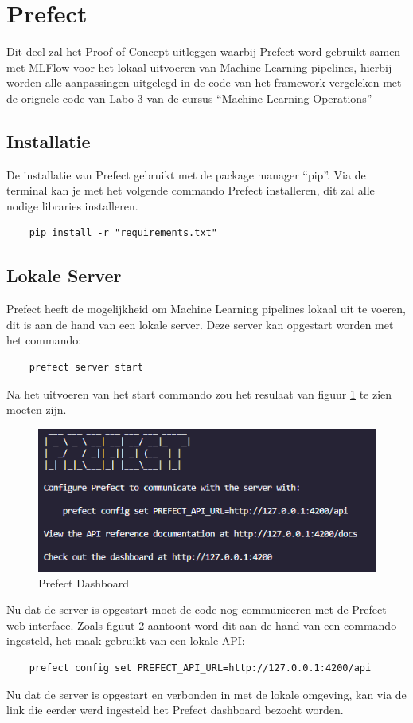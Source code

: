 \section{Prefect}
Dit deel zal het Proof of Concept uitleggen waarbij Prefect word gebruikt samen met MLFlow voor het lokaal uitvoeren van Machine Learning pipelines, hierbij worden alle aanpassingen uitgelegd in de code van het framework vergeleken met de orignele code van Labo 3 van de cursus ``Machine Learning Operations''
\subsection{Installatie}
De installatie van Prefect gebruikt met de package manager ``pip''. Via de terminal kan je met het volgende commando Prefect installeren, dit zal alle nodige libraries installeren.
\begin{verbatim}
    pip install -r "requirements.txt"
\end{verbatim}
\subsection{Lokale Server}
Prefect heeft de mogelijkheid om Machine Learning pipelines lokaal uit te voeren, dit is aan de hand van een lokale server. 
Deze server kan opgestart worden met het commando: 
\begin{verbatim}
    prefect server start
\end{verbatim}


Na het uitvoeren van het start commando zou het resulaat van figuur \ref{fig:Prefect_server} te zien moeten zijn.
\begin{figure}[]
    \includegraphics[width=\linewidth]{graphics/Prefect_server.PNG}
    \caption{Prefect Dashboard}
    \label{fig:Prefect_server}
\end{figure}
Nu dat de server is opgestart moet de code nog communiceren met de Prefect web interface. 
Zoals figuut 2 aantoont word dit aan de hand van een commando ingesteld, het maak gebruikt van een lokale API:
\begin{verbatim}
    prefect config set PREFECT_API_URL=http://127.0.0.1:4200/api
\end{verbatim}
Nu dat de server is opgestart en verbonden in met de lokale omgeving, kan via de link die eerder werd ingesteld het Prefect dashboard bezocht worden.

